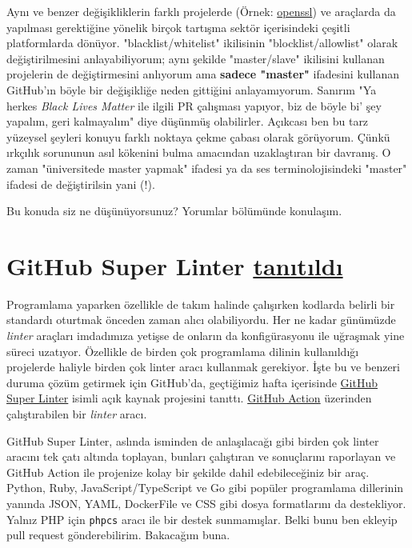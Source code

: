 \documentclass[11pt]{article}
\begin{document}
Aynı ve benzer değişikliklerin farklı projelerde (Örnek: \href{https://github.com/openssl/openssl/pull/12089}{openssl}) ve araçlarda
da yapılması gerektiğine yönelik birçok tartışma sektör içerisindeki çeşitli
platformlarda dönüyor. "blacklist/whitelist" ikilisinin "blocklist/allowlist"
olarak değiştirilmesini anlayabiliyorum; aynı şekilde "master/slave" ikilisini
kullanan projelerin de değiştirmesini anlıyorum ama \textbf{sadece "master"}
ifadesini kullanan GitHub'ın böyle bir değişikliğe neden gittiğini
anlayamıyorum. Sanırım "Ya herkes \emph{Black Lives Matter} ile ilgili PR çalışması
yapıyor, biz de böyle bi' şey yapalım, geri kalmayalım" diye düşünmüş
olabilirler. Açıkcası ben bu tarz yüzeysel şeyleri konuyu farklı noktaya çekme
çabası olarak görüyorum. Çünkü ırkçılık sorununun asıl kökenini bulma
amacından uzaklaştıran bir davranış. O zaman "üniversitede master yapmak"
ifadesi ya da ses terminolojisindeki "master" ifadesi de değiştirilsin yani
(!).

Bu konuda siz ne düşünüyorsunuz? Yorumlar bölümünde konulaşım.
\section{GitHub Super Linter \href{https://github.blog/2020-06-18-introducing-github-super-linter-one-linter-to-rule-them-all/}{tanıtıldı}}
\label{sec:org9dc3d6a}
Programlama yaparken özellikle de takım halinde çalışırken kodlarda belirli
bir standardı oturtmak önceden zaman alıcı olabiliyordu. Her ne kadar
günümüzde \emph{linter} araçları imdadımıza yetişse de onların da konfigürasyonu
ile uğraşmak yine süreci uzatıyor. Özellikle de birden çok programlama dilinin
kullanıldığı projelerde haliyle birden çok linter aracı kullanmak gerekiyor.
İşte bu ve benzeri duruma çözüm getirmek için GitHub'da, geçtiğimiz hafta
içerisinde \href{https://github.com/github/super-linter}{GitHub Super Linter} isimli açık kaynak projesini tanıttı. \href{https://github.com/features/actions}{GitHub
Action} üzerinden çalıştırabilen bir \emph{linter} aracı.

GitHub Super Linter, aslında isminden de anlaşılacağı gibi birden çok linter
aracını tek çatı altında toplayan, bunları çalıştıran ve sonuçlarını
raporlayan ve GitHub Action ile projenize kolay bir şekilde dahil
edebileceğiniz bir araç. Python, Ruby, JavaScript/TypeScript ve Go gibi
popüler programlama dillerinin yanında JSON, YAML, DockerFile ve CSS gibi
dosya formatlarını da destekliyor. Yalnız PHP için \texttt{phpcs} aracı ile bir
destek sunmamışlar. Belki bunu ben ekleyip pull request gönderebilirim.
Bakacağım buna.
\end{document}
